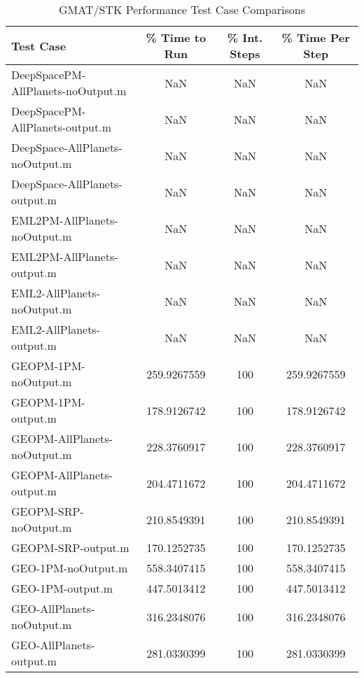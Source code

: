 \begin{table}[htbp!]
\centering
\caption{ GMAT/STK Performance Test Case Comparisons}
      \begin{tabular}{lccc}
      \hline\hline
          Test Case & \% Time to Run & \% Int. Steps & \% Time Per Step \\
         \hline
         DeepSpacePM-AllPlanets-noOutput.m & NaN & NaN & NaN \\
         DeepSpacePM-AllPlanets-output.m & NaN & NaN & NaN \\
         DeepSpace-AllPlanets-noOutput.m & NaN & NaN & NaN \\
         DeepSpace-AllPlanets-output.m & NaN & NaN & NaN \\
         EML2PM-AllPlanets-noOutput.m & NaN & NaN & NaN \\
         EML2PM-AllPlanets-output.m & NaN & NaN & NaN \\
         EML2-AllPlanets-noOutput.m & NaN & NaN & NaN \\
         EML2-AllPlanets-output.m & NaN & NaN & NaN \\
         GEOPM-1PM-noOutput.m & 259.9267559 & 100 & 259.9267559 \\
         GEOPM-1PM-output.m & 178.9126742 & 100 & 178.9126742 \\
         GEOPM-AllPlanets-noOutput.m & 228.3760917 & 100 & 228.3760917 \\
         GEOPM-AllPlanets-output.m & 204.4711672 & 100 & 204.4711672 \\
         GEOPM-SRP-noOutput.m & 210.8549391 & 100 & 210.8549391 \\
         GEOPM-SRP-output.m & 170.1252735 & 100 & 170.1252735 \\
         GEO-1PM-noOutput.m & 558.3407415 & 100 & 558.3407415 \\
         GEO-1PM-output.m & 447.5013412 & 100 & 447.5013412 \\
         GEO-AllPlanets-noOutput.m & 316.2348076 & 100 & 316.2348076 \\
         GEO-AllPlanets-output.m & 281.0330399 & 100 & 281.0330399 \\

\end{tabular}
\end{table}
